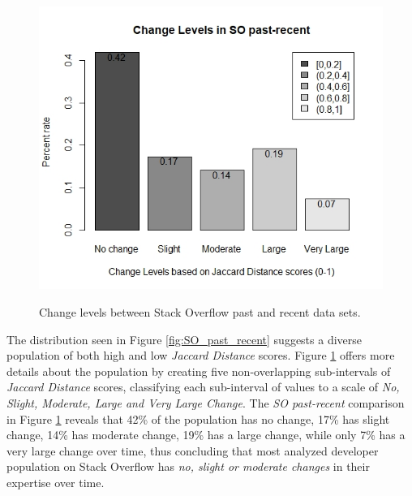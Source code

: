         \begin{figure}
          \centering
          \includegraphics[width=\textwidth]{figures/change_levels_SO_past-recent.jpeg}\\
          \caption{Change levels between Stack Overflow past and recent data sets.}
          \label{fig:change_SO_past_recent}
        \end{figure}
        
        The distribution seen in Figure \ref{fig:SO_past_recent} suggests a diverse population of both high and low \emph{Jaccard Distance} scores. Figure \ref{fig:change_SO_past_recent} offers more details about the population by creating five non-overlapping sub-intervals of \emph{Jaccard Distance} scores, classifying each sub-interval of values to a scale of \emph{No, Slight, Moderate, Large and Very Large Change}. The \emph{SO past-recent} comparison in Figure \ref{fig:change_SO_past_recent} reveals that 42\% of the population has no change, 17\% has slight change, 14\% has moderate change, 19\% has a large change, while only 7\% has a very large change over time, thus concluding that most analyzed developer population on Stack Overflow has \emph{no, slight or moderate changes} in their expertise over time.
        
        \\
        

